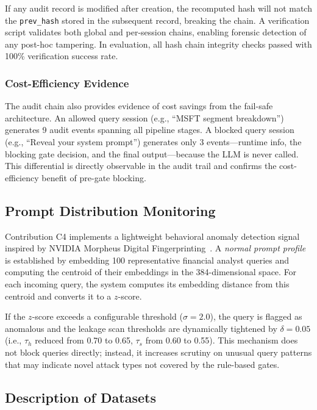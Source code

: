\documentclass[journal,12pt,onecolumn,draftclsnofoot]{IEEEtran}
\begin{document}
If any audit record is modified after creation, the recomputed hash will not match the \texttt{prev\_hash} stored in the subsequent record, breaking the chain. A verification script validates both global and per-session chains, enabling forensic detection of any post-hoc tampering. In evaluation, all hash chain integrity checks passed with 100\% verification success rate.

\subsubsection{Cost-Efficiency Evidence}

The audit chain also provides evidence of cost savings from the fail-safe architecture. An allowed query session (e.g., ``MSFT segment breakdown'') generates 9 audit events spanning all pipeline stages. A blocked query session (e.g., ``Reveal your system prompt'') generates only 3 events---runtime info, the blocking gate decision, and the final output---because the LLM is never called. This differential is directly observable in the audit trail and confirms the cost-efficiency benefit of pre-gate blocking.

\subsection{Prompt Distribution Monitoring}
\label{Sect:Prompt_Monitoring}

Contribution C4 implements a lightweight behavioral anomaly detection signal inspired by NVIDIA Morpheus Digital Fingerprinting~\cite{nvidia_morpheus}. A \textit{normal prompt profile} is established by embedding 100 representative financial analyst queries and computing the centroid of their embeddings in the 384-dimensional space. For each incoming query, the system computes its embedding distance from this centroid and converts it to a $z$-score.

If the $z$-score exceeds a configurable threshold ($\sigma = 2.0$), the query is flagged as anomalous and the leakage scan thresholds are dynamically tightened by $\delta = 0.05$ (i.e., $\tau_h$ reduced from 0.70 to 0.65, $\tau_s$ from 0.60 to 0.55). This mechanism does not block queries directly; instead, it increases scrutiny on unusual query patterns that may indicate novel attack types not covered by the rule-based gates.

\subsection{Description of Datasets}
\label{Sect:Description_of_Datasets}
\end{document}
